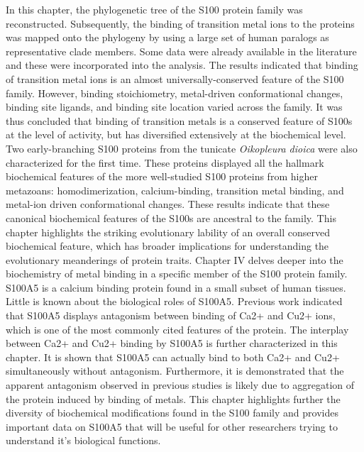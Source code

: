 In this chapter, the phylogenetic tree of the S100 protein family was reconstructed. Subsequently, the binding of transition metal ions to the proteins was mapped onto the phylogeny by using a large set of human paralogs as representative clade members. Some data were already available in the literature and these were incorporated into the analysis. The results indicated that binding of transition metal ions is an almost universally-conserved feature of the S100 family. However, binding stoichiometry, metal-driven conformational changes, binding site ligands, and binding site location varied across the family. It was thus concluded that binding of transition metals is a conserved feature of S100s at the level of activity, but has diversified extensively at the biochemical level. Two early-branching S100 proteins from the tunicate \textit{Oikopleura dioica} were also characterized for the first time. These proteins displayed all the hallmark biochemical features of the more well-studied S100 proteins from higher metazoans: homodimerization, calcium-binding, transition metal binding, and metal-ion driven conformational changes. These results indicate that these canonical biochemical features of the S100s are ancestral to the family. This chapter highlights the striking evolutionary lability of an overall conserved biochemical feature, which has broader implications for understanding the evolutionary meanderings of protein traits. Chapter IV delves deeper into the biochemistry of metal binding in a specific member of the S100 protein family. S100A5 is a calcium binding protein found in a small subset of human tissues. Little is known about the biological roles of S100A5. Previous work indicated that S100A5 displays antagonism between binding of Ca2+ and Cu2+ ions, which is one of the most commonly cited features of the protein. The interplay between Ca2+ and Cu2+ binding by S100A5 is further characterized in this chapter. It is shown that S100A5 can actually bind to both Ca2+ and Cu2+ simultaneously without antagonism. Furthermore, it is demonstrated that the apparent antagonism observed in previous studies is likely due to aggregation of the protein induced by binding of metals. This chapter highlights further the diversity of biochemical modifications found in the S100 family and provides important data on S100A5 that will be useful for other researchers trying to understand it's biological functions. 
